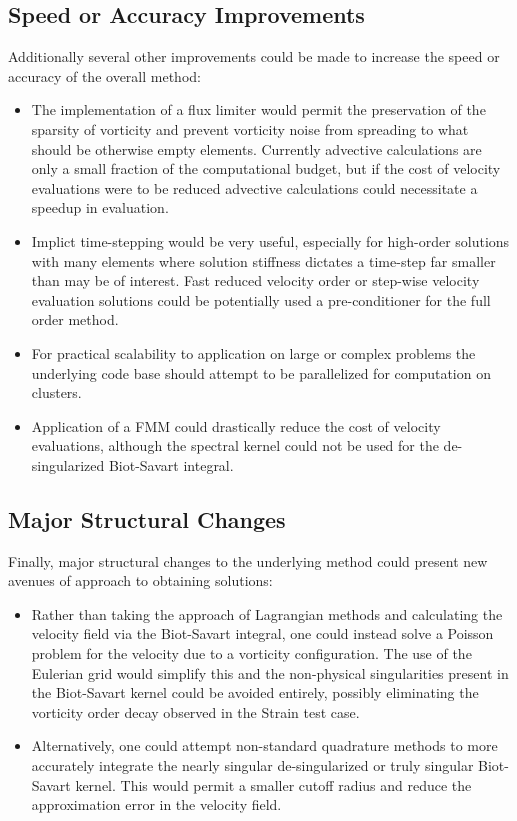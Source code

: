 \documentclass[letterpaper,12pt]{report}
\begin{document}
\subsection{Speed or Accuracy Improvements}
Additionally several other improvements could be made to increase the speed or accuracy of the overall method:
\begin{itemize}
\item The implementation of a flux limiter would permit the preservation of the sparsity of vorticity and prevent vorticity noise from spreading to what should be otherwise empty elements. Currently advective calculations are only a small fraction of the computational budget, but if the cost of velocity evaluations were to be reduced advective calculations could necessitate a speedup in evaluation.
\item Implict time-stepping would be very useful, especially for high-order solutions with many elements where solution stiffness dictates a time-step far smaller than may be of interest. Fast reduced velocity order or step-wise velocity evaluation solutions could be potentially used a pre-conditioner for the full order method.
\item For practical scalability to application on large or complex problems the underlying code base should attempt to be parallelized for computation on clusters.
\item Application of a FMM \cite{GreengardRokhlin1987} could drastically reduce the cost of velocity evaluations, although the spectral kernel could not be used for the de-singularized Biot-Savart integral.
\end{itemize}

\subsection{Major Structural Changes}
Finally, major structural changes to the underlying method could present new avenues of approach to obtaining solutions:
\begin{itemize}
\item Rather than taking the approach of Lagrangian methods and calculating the velocity field via the Biot-Savart integral, one could instead solve a Poisson problem for the velocity due to a vorticity configuration. The use of the Eulerian grid would simplify this and the non-physical singularities present in the Biot-Savart kernel could be avoided entirely, possibly eliminating the vorticity order decay observed in the Strain test case.
\item Alternatively, one could attempt non-standard quadrature methods to more accurately integrate the nearly singular de-singularized or truly singular Biot-Savart kernel. This would permit a smaller cutoff radius and reduce the approximation error in the velocity field.
\end{itemize}
\end{document}
